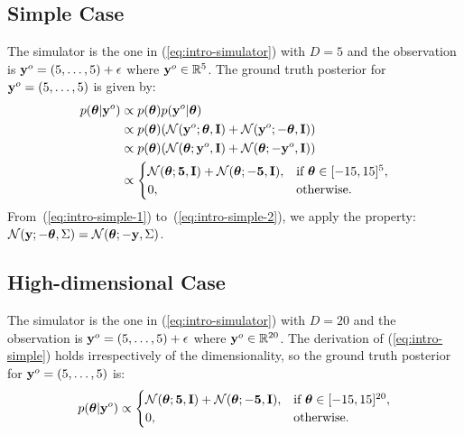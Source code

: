 \subsection{Simple Case}

The simulator is the one in (\ref{eq:intro-simulator}) with $D = 5$ and
the observation is $\mathbf{y}^o = (5, \ldots, 5) + \epsilon$ where $\mathbf{y}^o \in \mathbb{R}^5$.
The ground truth posterior for $\mathbf{y}^o = (5, \ldots, 5)$ is given by:
\begin{align}
  p(\boldsymbol{\theta} | \mathbf{y}^o)
  &\propto p(\boldsymbol{\theta}) p(\mathbf{y}^o | \boldsymbol{\theta}) \\
  &\propto p(\boldsymbol{\theta}) ( \mathcal{N}(\mathbf{y}^o; \boldsymbol{\theta}, \mathbf{I}) + \mathcal{N}(\mathbf{y}^o; -\boldsymbol{\theta}, \mathbf{I}) ) \label{eq:intro-simple-1} \\
  &\propto p(\boldsymbol{\theta}) ( \mathcal{N}(\boldsymbol{\theta}; \mathbf{y}^o, \mathbf{I}) + \mathcal{N}(\boldsymbol{\theta}; -\mathbf{y}^o, \mathbf{I}) ) \label{eq:intro-simple-2} \\
  &\propto
    \begin{cases}
      \mathcal{N}(\boldsymbol{\theta}; \mathbf{5}, \mathbf{I}) + \mathcal{N}(\boldsymbol{\theta}; -\mathbf{5}, \mathbf{I}), & \text{if } \boldsymbol{\theta} \in [-15, 15]^5, \\
      0, & \text{otherwise}.
    \end{cases}
    \label{eq:intro-simple}
\end{align}
%
From~(\ref{eq:intro-simple-1}) to~(\ref{eq:intro-simple-2}), we apply the property: $\mathcal{N}(\mathbf{y}; - \boldsymbol{\theta}, \Sigma) = \mathcal{N}(\boldsymbol{\theta}; - \mathbf{y} , \Sigma)$.

\subsection{High-dimensional Case}

The simulator is the one in (\ref{eq:intro-simulator}) with $D = 20$ and
the observation is $\mathbf{y}^o = (5, \ldots, 5) + \epsilon$ where $\mathbf{y}^o \in \mathbb{R}^{20}$.
The derivation of (\ref{eq:intro-simple}) holds irrespectively of the dimensionality, so the ground truth posterior for $\mathbf{y}^o = (5, \ldots, 5)$ is:
%
\begin{equation}
  p(\boldsymbol{\theta} | \mathbf{y}^o) \propto
  \begin{cases}
    \mathcal{N}(\boldsymbol{\theta}; \mathbf{5}, \mathbf{I}) + \mathcal{N}(\boldsymbol{\theta}; -\mathbf{5}, \mathbf{I}), & \text{if } \boldsymbol{\theta} \in [-15, 15]^{20}, \\
    0, & \text{otherwise}.
  \end{cases}
  \label{eq:intro-highdim}
\end{equation}
%
